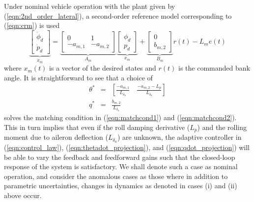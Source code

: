 Under nominal vehicle operation with the plant given by (\ref{eqn:2nd_order_lateral}), a second-order reference model corresponding to (\ref{eqn:crm}) is used
\begin{equation}
	\underbrace{\begin{bmatrix}
		\dot{\phi}_d \\ \dot{p}_d
	\end{bmatrix}}_{\dot{x}_m} = \underbrace{\begin{bmatrix}
		0 & 1\\ -a_{m,1} & -a_{m,2}
	\end{bmatrix}}_{A_m} \underbrace{\begin{bmatrix}
		\phi_d \\ p_d
	\end{bmatrix}}_{x_m} + \underbrace{\begin{bmatrix}
		0 \\ b_{m,2}
	\end{bmatrix}}_{B_m} r(t) - L_m e(t)
	\label{eqn:rm_2_symbolic}
\end{equation}
\noindent where $x_m(t)$ is a vector of the desired states and $r(t)$ is the commanded bank angle. It is straightforward to see that a choice of
\begin{eqnarray}
	\theta^* &=& \left[ \frac{-a_{m,1}}{L_{\delta_a}} \quad \frac{-a_{m,2}-L_p}{L_{\delta_a}} \right] \label{e:tstar}\\
	q^* &=& \frac{b_{m,2}}{L_{\delta_a}} \label{e:qstar}
\end{eqnarray} 
\noindent solves the matching condition in (\ref{eqn:matchcond1}) and (\ref{eqn:matchcond2}). This in turn implies that even if the roll damping derivative ($L_p$) and the rolling moment due to aileron deflection ($L_{\delta_a}$) are unknown, the adaptive controller in (\ref{eqn:control_law}), (\ref{eqn:thetadot_projection}), and (\ref{eqn:qdot_projection}) will be able to vary the feedback and feedforward gains such that the closed-loop response of the system is satisfactory. We shall denote such a case as nominal operation, and consider the anomalous cases as those where in addition to parametric uncertainties, changes in dynamics as denoted in cases (i) and (ii) above occur.

